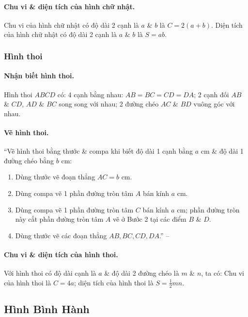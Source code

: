 \documentclass{article}
\numberwithin{equation}{section}
\begin{document}
\paragraph{Chu vi \& diện tích của hình chữ nhật.} Chu vi của hình chữ nhật có độ dài 2 cạnh là $a$ \& $b$ là $C = 2(a + b)$. Diện tích của hình chữ nhật có độ dài 2 cạnh là $a$ \& $b$ là $S = ab$.

\subsubsection{Hình thoi}

\paragraph{Nhận biết hình thoi.} Hình thoi $ABCD$ có: 4 cạnh bằng nhau: $AB = BC = CD = DA$; 2 cạnh đối $AB$ \& $CD$, $AD$ \& $BC$ song song với nhau; 2 đường chéo $AC$ \& $BD$ vuông góc với nhau.

\paragraph{Vẽ hình thoi.} ``Vẽ hình thoi bằng thước \& compa khi biết độ dài 1 cạnh bằng $a$ cm \& độ dài 1 đường chéo bằng $b$ cm:
\begin{enumerate}
	\item Dùng thước vẽ đoạn thẳng $AC = b$ cm.
	\item Dùng compa vẽ 1 phần đường tròn tâm $A$ bán kính $a$ cm.
	\item Dùng compa vẽ 1 phần đường tròn tâm $C$ bán kính $a$ cm; phần đường tròn này cắt phần đường tròn tâm $A$ vẽ ở Bước 2 tại các điểm $B$ \& $D$.
	\item Dùng thước vẽ các đoạn thẳng $AB,BC,CD,DA$.'' -- \cite[p. 100]{Thai_Anh_Dat_Ha_Loan_Nam_Quang_Toan_6_tap_1}
\end{enumerate}

\paragraph{Chu vi \& diện tích của hình thoi.} Với hình thoi có độ dài cạnh là $a$ \& độ dài 2 đường chéo là $m$ \& $n$, ta có: Chu vi của hình thoi là $C = 4a$; diện tích của hình thoi là $S = \frac{1}{2}mn$.

\subsection{Hình Bình Hành}
\end{document}
